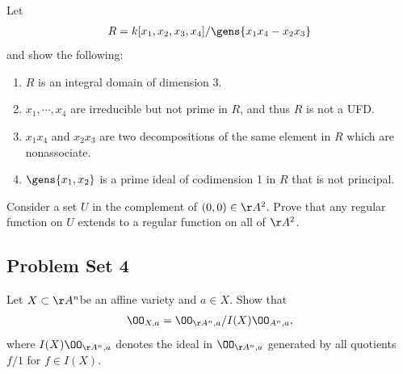 \begin{exercise}[Gathmann 2.40]

Let
\begin{align*}  
R = k[x_1, x_2, x_3, x_4] / \gens{x_1 x_4 - x_2 x_3} 
\end{align*} and show the following:

\begin{enumerate}
\def\labelenumi{\alph{enumi}.}
\item
  \(R\) is an integral domain of dimension 3.
\item
  \(x_1, \cdots, x_4\) are irreducible but not prime in \(R\), and thus
  \(R\) is not a UFD.
\item
  \(x_1 x_4\) and \(x_2 x_3\) are two decompositions of the same element
  in \(R\) which are nonassociate.
\item
  \(\gens{x_1, x_2}\) is a prime ideal of codimension 1 in \(R\) that is
  not principal.
\end{enumerate}

\end{exercise}

\begin{exercise}[Problem 5]

Consider a set \(U\) in the complement of \((0, 0) \in \AA^2\). Prove
that any regular function on \(U\) extends to a regular function on all
of \(\AA^2\).

\end{exercise}

\hypertarget{problem-set-4}{%
\subsection{Problem Set 4}\label{problem-set-4}}

\begin{problem}[Gathmann 3.20]

Let \(X\subset \AA^n\)be an affine variety and \(a\in X\). Show that
\begin{align*}  
\OO_{X, a} = \OO_{\AA^n, a} / I(X) \OO_{A^n,a}
,\end{align*} where \(I(X) \OO_{\AA^n, a}\) denotes the ideal in
\(\OO_{\AA^n, a}\) generated by all quotients \(f/1\) for \(f\in I(X)\).

\end{problem}

